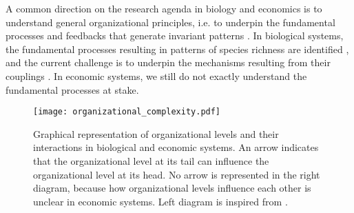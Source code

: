 % 
A common direction on the research agenda in biology and economics is to understand general organizational principles, i.e.  to underpin the fundamental processes and feedbacks that generate invariant patterns \citep{Levin2002,Olff2009,Veldhuis2018}.
% 
In biological systems, the fundamental processes resulting in patterns of species richness are identified \citep{Rahbek2019a,Rangel2018,Hagen}, and the current challenge is to underpin the mechanisms resulting from their couplings \citep{Hagen2022}.
% 
In economic systems, we still do not exactly understand the fundamental processes at stake. 
% 
% 
% 

\begin{figure}[ht]
    \centering
    \texttt{[image: organizational\_complexity.pdf]}
\caption{Graphical representation of organizational levels and their interactions in biological and economic systems. An arrow indicates that the organizational level at its tail can influence the organizational level at its head. No arrow is represented in the right diagram, because how organizational levels influence each other is unclear in economic systems. Left diagram is inspired from \cite{Hendry+2016}.}
\label{fig:organisational_levels}
\end{figure}






